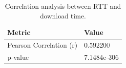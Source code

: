 \begin{table}
\caption{Correlation analysis between RTT and download time.}
\label{tab:corr_results}
\begin{tabular}{ll}
\toprule
Metric & Value \\
\midrule
Pearson Correlation (r) & 0.592200 \\
p-value & 7.1484e-306 \\
\bottomrule
\end{tabular}
\end{table}
